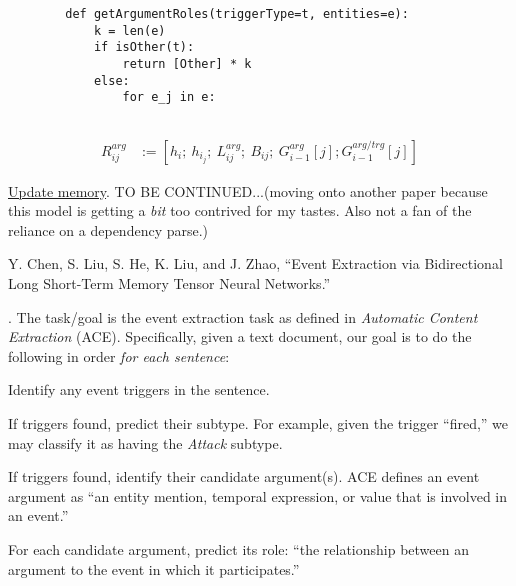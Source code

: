 \documentclass[11pt]{article}
\newcommand\p{\Needspace{10\baselineskip} \noindent}
\begin{document}
\begin{compactitem}[-]
\begin{compactenum}
		\lstset{language=Python}
		\begin{lstlisting}
		def getArgumentRoles(triggerType=t, entities=e):
			k = len(e)
			if isOther(t):
				return [Other] * k 
			else:
				for e_j in e:
					
		\end{lstlisting}

		\begin{align}
		R_{ij}^{arg} &:= \left[ h_i;~ h_{i_j};~ L_{ij}^{arg};~ B_{ij};~ G_{i-1}^{arg}[j]; G_{i-1}^{arg/trg}[j] \right]
		\end{align}

		\item \underline{Update memory}. TO BE CONTINUED...(moving onto another paper because this model is getting a \textit{bit} too contrived for my tastes. Also not a fan of the reliance on a dependency parse.)
	\end{compactenum}
\end{compactitem}


\begin{comment}
\lecture{Papers and Tutorials}{Zero-Shot Learning for Event Extraction}{Oct 31, 2017}

\vspace{-1em}
{\footnotesize L. Huang, H. Ji, K. Cho, and C. Voss, ``Zero-Shot Learning for Event Extraction,'' (2017).}
\end{comment}




\vspace{-1em}
{\footnotesize Y. Chen, S. Liu, S. He, K. Liu, and J. Zhao, ``Event Extraction via Bidirectional Long Short-Term Memory Tensor Neural Networks.''}

\p {}. The task/goal is the event extraction task as defined in \textit{Automatic Content Extraction} (ACE). Specifically, given a text document, our goal is to do the following in order \textit{for each sentence}:
\begin{compactenum}
	\item Identify any event triggers in the sentence.
	\item If triggers found, predict their subtype. For example, given the trigger ``fired,'' we may classify it as having the \textit{Attack} subtype.
	\item If triggers found, identify their candidate argument(s). ACE defines an event argument as ``an entity mention, temporal expression, or value that is involved in an event.''
	\item For each candidate argument, predict its role: ``the relationship between an argument to the event in which it participates.''
\end{compactenum}
\end{document}
